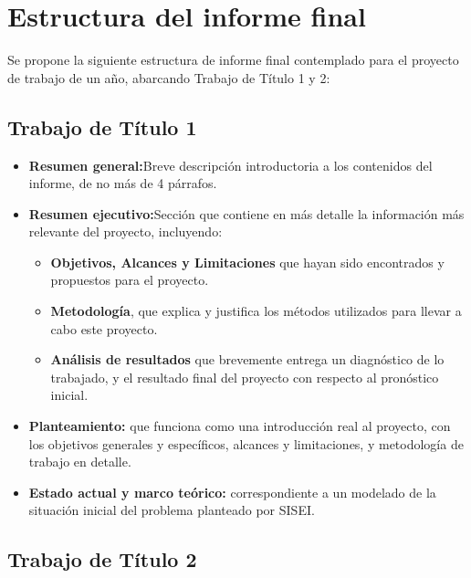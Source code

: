 \section{Estructura del informe final}
Se propone la siguiente estructura de informe final contemplado para el proyecto de trabajo de un año, abarcando Trabajo de Título 1 y 2:

\subsection*{Trabajo de Título 1}
\begin{itemize}
	\item \textbf{Resumen general:}Breve descripción introductoria a los contenidos del informe, de no más de 4 párrafos.
	\item \textbf{Resumen ejecutivo:}Sección que contiene en más detalle la información más relevante del proyecto, incluyendo:
	      \begin{itemize}
		      \item \textbf{Objetivos, Alcances y Limitaciones} que hayan sido encontrados y propuestos para el proyecto.
		      \item \textbf{Metodología}, que explica y justifica los métodos utilizados para llevar a cabo este proyecto.
		      \item \textbf{Análisis de resultados} que brevemente entrega un diagnóstico de lo trabajado, y el resultado final del proyecto con respecto al pronóstico inicial.
	      \end{itemize}
	\item \textbf{Planteamiento:} que funciona como una introducción real al proyecto, con los objetivos generales y específicos, alcances y limitaciones, y metodología de trabajo en detalle.
	\item \textbf{Estado actual y marco teórico:} correspondiente a un modelado de la situación inicial del problema planteado por SISEI.
\end{itemize}

\subsection*{Trabajo de Título 2}

\clearpage
